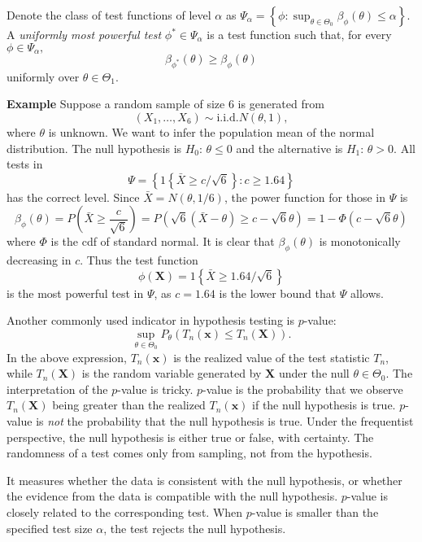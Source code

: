 \documentclass[11pt]{article}
\begin{document}
\bigskip


Denote the class of test
functions of level \(\alpha\) as
\(\Psi_{\alpha}=\left\{ \phi:\sup_{\theta\in\Theta_{0}}\beta_{\phi}\left(\theta\right)\leq\alpha\right\}\).
A \emph{uniformly most powerful test} \(\phi^{*}\in\Psi_{\alpha}\) is a
test function such that, for every \(\phi\in\Psi_{\alpha},\)
\[\beta_{\phi^{*}}\left(\theta\right)\geq\beta_{\phi}\left(\theta\right)\]
uniformly over \(\theta\in\Theta_{1}\).

\textbf{Example} Suppose a random sample of size 6 is generated from
\[\left(X_{1},\ldots,X_{6}\right)\sim\text{i.i.d.}N\left(\theta,1\right),\]
where \(\theta\) is unknown. We want to infer the population mean of the
normal distribution. The null hypothesis is \(H_{0}\): \(\theta\leq0\)
and the alternative is \(H_{1}\): \(\theta>0\). All tests in
\[\Psi=\left\{ 1\left\{ \bar{X}\geq c/\sqrt{6}\right\} :c\geq1.64\right\}\]
has the correct level. Since
\(\bar{X}=N\left(\theta,1/6 \right)\), the power function for
those in \(\Psi\) is
\[\beta_{\phi}\left(\theta\right)=P\left(\bar{X}\geq\frac{c}{\sqrt{6}}\right)=P\left(\sqrt{6}\left(\bar{X}-\theta\right)\geq c-\sqrt{6}\theta\right)=1-\Phi\left(c-\sqrt{6}\theta\right)\]
where \(\Phi\) is the cdf of standard normal. It is clear that
\(\beta_{\phi}\left(\theta\right)\) is monotonically decreasing in
\(c\). Thus the test function
\[\phi\left(\mathbf{X}\right)=1\left\{ \bar{X}\geq 1.64/\sqrt{6}\right\}\]
is the most powerful test in \(\Psi\), as \(c=1.64\) is the lower bound
that \(\Psi\) allows.

    Another commonly used indicator in hypothesis testing is \(p\)-value:
\[\sup_{\theta\in\Theta_{0}}P_{\theta}\left(T_{n}\left(\mathbf{x}\right)\leq T_{n}\left(\mathbf{X}\right)\right).\]
In the above expression, \(T_{n}\left(\mathbf{x}\right)\) is the
realized value of the test statistic \(T_{n}\), while
\(T_{n}\left(\mathbf{X}\right)\) is the random variable generated by
\(\mathbf{X}\) under the null \(\theta\in\Theta_{0}\). The
interpretation of the \(p\)-value is tricky. \(p\)-value is the
probability that we observe \(T_n (\mathbf{X})\) being greater than the
realized \(T_n (\mathbf{x} )\) if the null hypothesis is true.
\(p\)-value is \emph{not} the probability that the null hypothesis is
true. Under the frequentist perspective, the null hypothesis is either
true or false, with certainty. The randomness of a test comes only from
sampling, not from the hypothesis.

It measures whether the data is consistent with the null hypothesis, or
whether the evidence from the data is compatible with the null
hypothesis. \(p\)-value is closely related to the corresponding test.
When \(p\)-value is smaller than the specified test size \(\alpha\), the
test rejects the null hypothesis.
\end{document}
